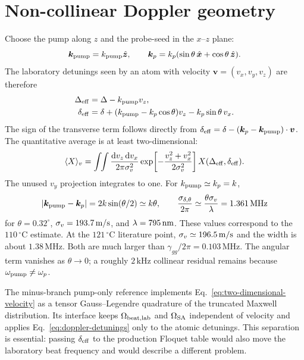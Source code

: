 \documentclass[11pt,a4paper]{article}
\newcommand{\dd}{\mathrm d}
\newcommand{\MHz}{\,\mathrm{MHz}}
\newcommand{\kHz}{\,\mathrm{kHz}}
\newcommand{\degC}{\,^{\circ}\mathrm C}
\begin{document}
\section{Non-collinear Doppler geometry}
\label{sec:doppler}

Choose the pump along $z$ and the probe-seed in the $x$--$z$ plane:
\[
\bm k_{\rm pump}=k_{\rm pump}\hat{\bm z},\qquad
\bm k_p=k_p(\sin\theta\,\hat{\bm x}+\cos\theta\,\hat{\bm z}).
\]
The laboratory detunings seen by an atom with velocity
$\bm v=(v_x,v_y,v_z)$ are therefore
\begin{align}
\Delta_{\rm eff}&=\Delta-k_{\rm pump}v_z,\\
\delta_{\rm eff}&=\delta+(k_{\rm pump}-k_p\cos\theta)v_z
-k_p\sin\theta\,v_x .
\label{eq:doppler-detunings}
\end{align}
The sign of the transverse term follows directly from
$\delta_{\rm eff}=\delta-(\bm k_p-\bm k_{\rm pump})\cdot\bm v$.
The quantitative average is at least two-dimensional:
\begin{equation}
\langle X\rangle_v=
\int\!\!\int\frac{\dd v_z\,\dd v_x}{2\pi\sigma_v^2}
\exp\!\left[-\frac{v_z^2+v_x^2}{2\sigma_v^2}\right]
X(\Delta_{\rm eff},\delta_{\rm eff}).
\label{eq:two-dimensional-velocity}
\end{equation}
The unused $v_y$ projection integrates to one. For
$k_{\rm pump}\simeq k_p=k$,
\begin{equation}
|\bm k_{\rm pump}-\bm k_p|=2k\sin(\theta/2)\simeq k\theta,\qquad
\frac{\sigma_{\delta,\theta}}{2\pi}
\simeq\frac{\theta\sigma_v}{\lambda}=1.361\MHz
\label{eq:angular-doppler}
\end{equation}
for $\theta=0.32^\circ$, $\sigma_v=193.7\,{\rm m/s}$, and
$\lambda=795\,{\rm nm}$. These values correspond to the $110\degC$ estimate. At the
$121\degC$ literature point, $\sigma_v\simeq196.5\,{\rm m/s}$ and the width is
about $1.38\MHz$. Both are much larger than
$\gamma_{gg}/2\pi=0.103\MHz$. The angular term vanishes as
$\theta\to0$; a roughly $2\kHz$ collinear residual remains because
$\omega_{\rm pump}\ne\omega_p$.

The minus-branch pump-only reference implements
Eq.~\eqref{eq:two-dimensional-velocity} as a tensor Gauss--Legendre quadrature
of the truncated Maxwell distribution. Its interface keeps
$\Omega_{\rm beat,lab}$ and $\Omega_{\rm SA}$ independent of velocity and
applies Eq.~\eqref{eq:doppler-detunings} only to the atomic detunings. This
separation is essential: passing $\delta_{\rm eff}$ to the production Floquet
table would also move the laboratory beat frequency and would describe a
different problem.
\end{document}
